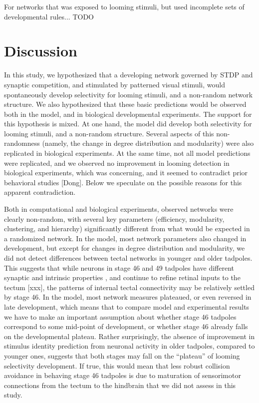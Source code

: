 \documentclass{article}
\begin{document}
For networks that was exposed to looming stimuli, but used incomplete sets of developmental rules... TODO

\section*{Discussion}

In this study, we hypothesized that a developing network governed by STDP and synaptic competition, and stimulated by patterned visual stimuli, would spontaneously develop selectivity for looming stimuli, and a non-random network structure. We also hypothesized that these basic predictions would be observed both in the model, and in biological developmental experiments. The support for this hypothesis is mixed. At one hand, the model did develop both selectivity for looming stimuli, and a non-random structure. Several aspects of this non-randomness (namely, the change in degree distribution and modularity) were also replicated in biological experiments. At the same time, not all model predictions were replicated, and we observed no improvement in looming detection in biological experiments, which was concerning, and it seemed to contradict prior behavioral studies [Dong]. Below we speculate on the possible reasons for this apparent contradiction.

Both in computational and biological experiments, observed networks were clearly non-random, with several key parameters (efficiency, modularity, clustering, and hierarchy) significantly different from what would be expected in a randomized network. In the model, most network parameters also changed in development, but except for changes in degree distribution and modularity, we did not detect differences between tectal networks in younger and older tadpoles. This suggests that while neurons in stage 46 and 49 tadpoles have different synaptic and intrinsic properties \citep{ciarleglio2015}, and continue to refine retinal inputs to the tectum \citep{tao2005refinement,munz2014hebbian}[xxx], the patterns of internal tectal connectivity may be relatively settled by stage 46. In the model, most network measures plateaued, or even reversed in late development, which means that to compare model and experimental results we have to make an important assumption about whether stage 46 tadpoles correspond to some mid-point of development, or whether stage 46 already falls on the developmental plateau. Rather surprisingly, the absence of improvement in stimulus identity prediction from neuronal activity in older tadpoles, compared to younger ones, suggests that both stages may fall on the “plateau” of looming selectivity development. If true, this would mean that less robust collision avoidance in behaving stage 46 tadpoles \citep{dong2009} is due to maturation of sensorimotor connections from the tectum to the hindbrain that we did not assess in this study.
\end{document}
